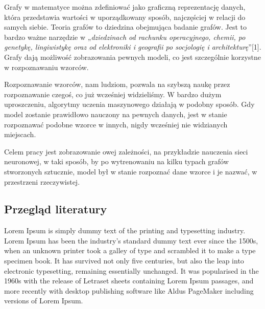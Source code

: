 Grafy w matematyce można zdefiniować jako graficzną reprezentację danych,
która przedstawia wartości w uporządkowany sposób,
najczęściej w relacji do samych siebie.
Teoria grafów to dziedzina obejmująca badanie grafów.
Jest to bardzo ważne narzędzie w „\textit{dziedzinach od rachunku operacyjnego, chemii, po genetykę, lingiwistykę
oraz od elektroniki i geografii po socjologię i architekturę}”[1].
Grafy dają możliwość zobrazowania pewnych modeli, co jest szczególnie korzystne w rozpoznawaniu wzorców.

Rozpoznawanie wzorców, nam ludziom, pozwala na szybszą naukę przez rozpoznawanie czegoś, co już wcześniej widzieliśmy.
W bardzo dużym uproszczeniu, algorytmy uczenia maszynowego działają w podobny sposób.
Gdy model zostanie prawidłowo nauczony na pewnych danych, jest w stanie rozpoznawać podobne wzorce w innych,
nigdy wcześniej nie widzianych miejscach.

Celem pracy jest zobrazowanie owej zależności, na przykładzie nauczenia sieci neuronowej,
w taki sposób, by po wytrenowaniu na kilku typach grafów stworzonych sztucznie,
model był w stanie rozpoznać dane wzorce i je nazwać, w przestrzeni rzeczywistej.

\subsection{Przegląd literatury}
Lorem Ipsum is simply dummy text of the printing and typesetting industry. Lorem Ipsum has been the industry's standard dummy text ever since the 1500s, when an unknown printer took a galley of type and scrambled it to make a type specimen book. It has survived not only five centuries, but also the leap into electronic typesetting, remaining essentially unchanged. It was popularised in the 1960s with the release of Letraset sheets containing Lorem Ipsum passages, and more recently with desktop publishing software like Aldus PageMaker including versions of Lorem Ipsum.
